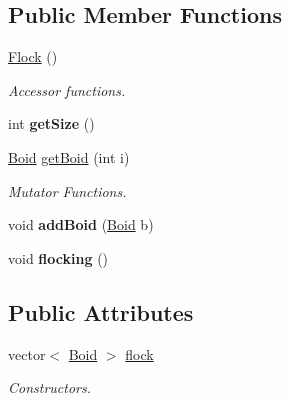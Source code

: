 \subsection*{Public Member Functions}
\begin{DoxyCompactItemize}
\item 
\hyperlink{class_flock_a2a0a514c368e21f718ad7358ed42f3b7}{Flock} ()\hypertarget{class_flock_a2a0a514c368e21f718ad7358ed42f3b7}{}\label{class_flock_a2a0a514c368e21f718ad7358ed42f3b7}

\begin{DoxyCompactList}\small\item\em Accessor functions. \end{DoxyCompactList}\item 
int {\bfseries get\+Size} ()\hypertarget{class_flock_ae5801b4eed7ae1e9719f50550424e8f1}{}\label{class_flock_ae5801b4eed7ae1e9719f50550424e8f1}

\item 
\hyperlink{class_boid}{Boid} \hyperlink{class_flock_a79925dd0c9568e57417d5d459711682d}{get\+Boid} (int i)\hypertarget{class_flock_a79925dd0c9568e57417d5d459711682d}{}\label{class_flock_a79925dd0c9568e57417d5d459711682d}

\begin{DoxyCompactList}\small\item\em Mutator Functions. \end{DoxyCompactList}\item 
void {\bfseries add\+Boid} (\hyperlink{class_boid}{Boid} b)\hypertarget{class_flock_ad671f2430e8b980c74d9654abe9acbc9}{}\label{class_flock_ad671f2430e8b980c74d9654abe9acbc9}

\item 
void {\bfseries flocking} ()\hypertarget{class_flock_a90c029c6cacb19193dd0b94ad74900e7}{}\label{class_flock_a90c029c6cacb19193dd0b94ad74900e7}

\end{DoxyCompactItemize}
\subsection*{Public Attributes}
\begin{DoxyCompactItemize}
\item 
vector$<$ \hyperlink{class_boid}{Boid} $>$ \hyperlink{class_flock_a5f82ca864e51913c633c2a75fe8ba854}{flock}\hypertarget{class_flock_a5f82ca864e51913c633c2a75fe8ba854}{}\label{class_flock_a5f82ca864e51913c633c2a75fe8ba854}

\begin{DoxyCompactList}\small\item\em Constructors. \end{DoxyCompactList}\end{DoxyCompactItemize}


